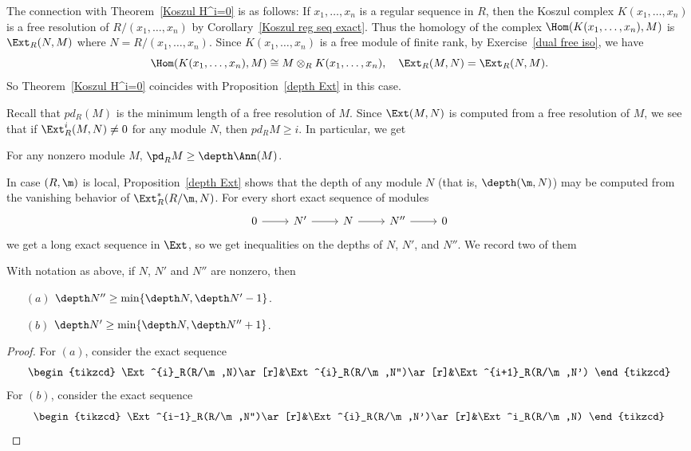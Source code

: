 The connection with Theorem~\ref{Koszul H^i=0} is as follows: If $x_1,\dots,x_n$ is a regular sequence in $R$, then the Koszul complex $K(x_1,\dots,x_n)$ is a free resolution of $R/(x_1,\dots,x_n)$ by Corollary~\ref{Koszul reg seq exact}. Thus the homology of the complex $\Hom(K(x_1,\dots,x_n),M)$ is $\Ext_R(N,M)$ where $N=R/(x_1,\dots,x_n)$. Since $K(x_1,\dots,x_n)$ is a free module of finite rank, by Exercise~\ref{dual free iso}, we have
\[\Hom(K(x_1,\dots,x_n),M)\cong M\otimes_RK(x_1,\dots,x_n),\quad \Ext_R(M,N)=\Ext_R(N,M).\]
So Theorem~\ref{Koszul H^i=0} coincides with Proposition~\ref{depth Ext} in this case.\par
Recall that $pd_R(M)$ is the minimum length of a free resolution of $M$. Since $\Ext(M,N)$ is computed from a free resolution of $M$, we see that if
$\Ext^i_R(M,N)\neq0$ for any module $N$, then $pd_RM\geq i$. In particular, we get
\begin{proposition}
For any nonzero module $M$, $\pd_RM\geq\depth\Ann(M)$.
\end{proposition}
In case $(R,\m)$ is local, Proposition~\ref{depth Ext} shows that the depth of any module $N$ (that is, $\depth(\m,N)$) may be computed from the vanishing behavior of $\Ext^*_R(R/\m,N)$. For every short exact sequence of modules
\[\begin{tikzcd}
0\ar[r]&N'\ar[r]&N\ar[r]&N''\ar[r]&0
\end{tikzcd}\]
we get a long exact sequence in $\Ext$, so we get inequalities on the depths of $N$, $N'$, and $N''$. We record two of them
\begin{corollary}
With notation as above, if $N$, $N'$ and $N''$ are nonzero, then
\begin{itemize}
\item[$(a)$]$\depth N''\geq\min\{\depth N,\depth N'-1\}$.
\item[$(b)$]$\depth N'\geq\min\{\depth N,\depth N''+1\}$.
\end{itemize}
\end{corollary}
\begin{proof}
For $(a)$, consider the exact sequence
\[\begin{tikzcd}
\Ext^{i}_R(R/\m,N)\ar[r]&\Ext^{i}_R(R/\m,N'')\ar[r]&\Ext^{i+1}_R(R/\m,N')
\end{tikzcd}\]
For $(b)$, consider the exact sequence
\[\begin{tikzcd}
\Ext^{i-1}_R(R/\m,N'')\ar[r]&\Ext^{i}_R(R/\m,N')\ar[r]&\Ext^i_R(R/\m,N)
\end{tikzcd}\]
\end{proof}
